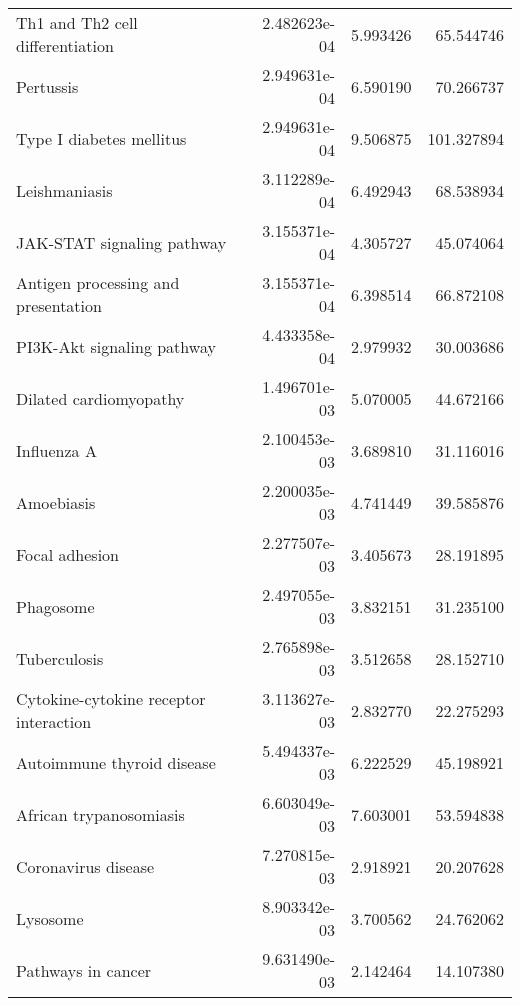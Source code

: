 \begin{tabular}{lrrr}
                  Th1 and Th2 cell differentiation &      2.482623e-04 &  5.993426 &       65.544746 \\
                                         Pertussis &      2.949631e-04 &  6.590190 &       70.266737 \\
                          Type I diabetes mellitus &      2.949631e-04 &  9.506875 &      101.327894 \\
                                     Leishmaniasis &      3.112289e-04 &  6.492943 &       68.538934 \\
                        JAK-STAT signaling pathway &      3.155371e-04 &  4.305727 &       45.074064 \\
               Antigen processing and presentation &      3.155371e-04 &  6.398514 &       66.872108 \\
                        PI3K-Akt signaling pathway &      4.433358e-04 &  2.979932 &       30.003686 \\
                            Dilated cardiomyopathy &      1.496701e-03 &  5.070005 &       44.672166 \\
                                       Influenza A &      2.100453e-03 &  3.689810 &       31.116016 \\
                                        Amoebiasis &      2.200035e-03 &  4.741449 &       39.585876 \\
                                    Focal adhesion &      2.277507e-03 &  3.405673 &       28.191895 \\
                                         Phagosome &      2.497055e-03 &  3.832151 &       31.235100 \\
                                      Tuberculosis &      2.765898e-03 &  3.512658 &       28.152710 \\
            Cytokine-cytokine receptor interaction &      3.113627e-03 &  2.832770 &       22.275293 \\
                        Autoimmune thyroid disease &      5.494337e-03 &  6.222529 &       45.198921 \\
                           African trypanosomiasis &      6.603049e-03 &  7.603001 &       53.594838 \\
                               Coronavirus disease &      7.270815e-03 &  2.918921 &       20.207628 \\
                                          Lysosome &      8.903342e-03 &  3.700562 &       24.762062 \\
                                Pathways in cancer &      9.631490e-03 &  2.142464 &       14.107380 \\

\end{tabular}

